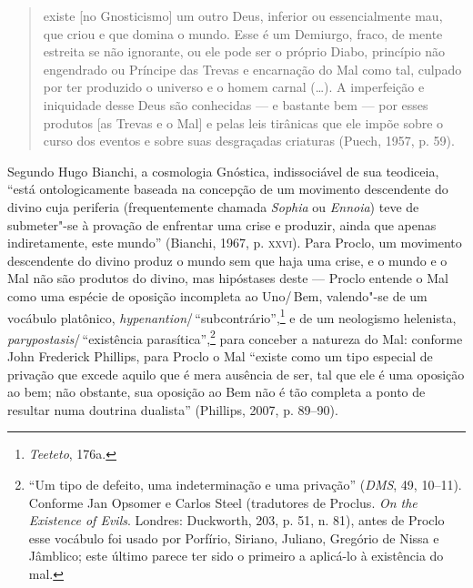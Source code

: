 \begin{quote}
existe [no Gnosticismo] um outro Deus, inferior ou essencialmente
mau, que criou e que domina o mundo. Esse é um Demiurgo, fraco,
de mente estreita se não ignorante, ou ele pode ser o próprio
Diabo, princípio não engendrado ou Príncipe das Trevas e
encarnação do Mal como tal, culpado por ter produzido o universo
e o homem carnal (\ldots{}). A imperfeição e iniquidade desse Deus
são conhecidas --- e bastante bem --- por esses produtos [as Trevas
e o Mal] e pelas leis tirânicas que ele impõe sobre o curso dos
eventos e sobre suas desgraçadas criaturas (Puech, 1957, p. 59).
\end{quote}

Segundo Hugo Bianchi, a cosmologia Gnóstica, indissociável de sua
teodiceia, “está ontologicamente baseada na concepção de um
movimento descendente do divino cuja periferia (frequentemente
chamada \emph{Sophia} ou \emph{Ennoia}) teve de submeter"-se
à provação de enfrentar uma crise e produzir, ainda que apenas
indiretamente, este mundo” (Bianchi, 1967, p. \textsc{xxvi}). Para
Proclo, um movimento descendente do divino produz o mundo sem
que haja uma crise, e o mundo e o Mal não são produtos do
divino, mas hipóstases deste --- Proclo entende o Mal como uma
espécie de oposição incompleta ao Uno/\,Bem, valendo"-se de um
vocábulo platônico,
\emph{hyp}\emph{e}\emph{nantion}/\,“subcontrário”,\footnote{
\emph{Teeteto}, 176a.} e de um neologismo helenista,
\emph{parypostasis}/\,“existência parasítica”,\footnote{ “Um tipo
de defeito, uma indeterminação e uma privação” (\emph{DMS},
49, 10--11). Conforme Jan Opsomer e Carlos Steel (tradutores de
Proclus. \textit{On the Existence of Evils}. Londres: Duckworth,
203, p. 51, n. 81), antes de Proclo esse vocábulo foi usado por
Porfírio, Siriano, Juliano, Gregório de Nissa e Jâmblico; este
último parece ter sido o primeiro a aplicá-lo à existência do
mal.} para conceber a natureza do Mal: conforme John Frederick
Phillips, para Proclo o Mal “existe como um tipo especial de
privação que excede aquilo que é mera ausência de ser, tal que
ele é uma oposição ao bem; não obstante, sua oposição ao Bem não
é tão completa a ponto de resultar numa doutrina dualista”
(Phillips, 2007, p. 89--90). 

